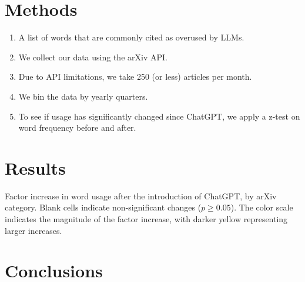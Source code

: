 \documentclass[twocolumn]{aastex701}
\begin{document}
\section{Methods}

\begin{enumerate}
    \item A list of words that are commonly cited as overused by LLMs.
    \item We collect our data using the arXiv API.
    \item Due to API limitations, we take 250 (or less) articles per month.
    \item We bin the data by yearly quarters.
    \item To see if usage has significantly changed since ChatGPT, we apply a z-test on word frequency before and after.
\end{enumerate}

\section{Results}

\begin{table*}[h]
\centering
\scriptsize
\setlength{\tabcolsep}{3pt}

\caption{Factor increase in word usage after the introduction of ChatGPT, by arXiv category.
Blank cells indicate non-significant changes ($p \geq 0.05$).
The color scale indicates the magnitude of the factor increase, with darker yellow representing larger increases.}
\end{table*}

\section{Conclusions}

{}

\end{document}
